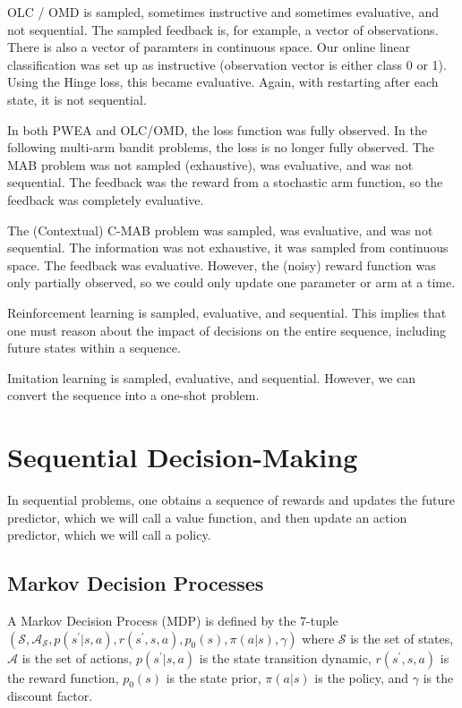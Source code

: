 \documentclass[11pt]{article}
\begin{document}
OLC / OMD is sampled, sometimes instructive and sometimes evaluative, and not sequential. The sampled feedback is, for example, a vector of observations. There is also a vector of paramters in continuous space. Our online linear classification was set up as instructive (observation vector is either class 0 or 1). Using the Hinge loss, this became evaluative. Again, with restarting after each state, it is not sequential.

In both PWEA and OLC/OMD, the loss function was fully observed.
In the following multi-arm bandit problems, the loss is no longer fully observed.
The MAB problem was not sampled (exhaustive), was evaluative, and was not sequential. The feedback was the reward from a stochastic arm function, so the feedback was completely evaluative. 

The (Contextual) C-MAB problem was sampled, was evaluative, and was not sequential. The information was not exhaustive, it was sampled from continuous space. The feedback was evaluative. However, the (noisy) reward function was only partially observed, so we could only update one parameter or arm at a time.

Reinforcement learning is sampled, evaluative, and sequential. This implies that one must reason about the impact of decisions on the entire sequence, including future states within a sequence.

Imitation learning is sampled, evaluative, and sequential. However, we can convert the sequence into a one-shot problem. 

\section{Sequential Decision-Making}
In sequential problems, one obtains a sequence of rewards and updates the future predictor, which we will call a value function, and then update an action predictor, which we will call a policy.

\subsection{Markov Decision Processes}
A Markov Decision Process (MDP) is defined by the 7-tuple $(\mathcal{S}, \mathcal{A}_\mathcal{S}, p(s^\prime|s,a), r(s^\prime,s,a), p_0(s), \pi(a|s), \gamma)$ where $\mathcal{S}$ is the set of states, $\mathcal{A}$ is the set of actions, $p(s^\prime|s,a)$ is the state transition dynamic, $r(s^\prime,s,a)$ is the reward function, $p_0(s)$ is the state prior, $\pi(a|s)$ is the policy, and $\gamma$ is the discount factor.
\end{document}
